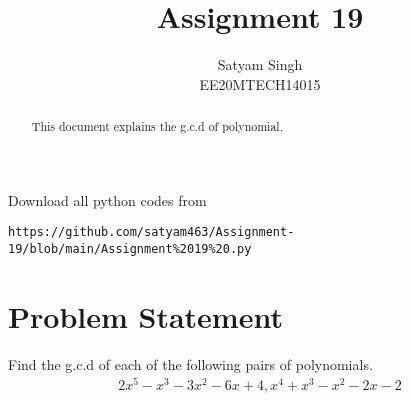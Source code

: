 \documentclass[journal,12pt,twocolumn]{IEEEtran}
\begin{document}
     \def\rightbox#1{\makebox[0in][r]{#1}}
     \def\centbox#1{\makebox[0in]{#1}}
     \def\topbox#1{\raisebox{-\baselineskip}[0in][0in]{#1}}
     \def\midbox#1{\raisebox{-0.5\baselineskip}[0in][0in]{#1}}
\vspace{3cm}
\title{Assignment 19}
\author{Satyam Singh \\ EE20MTECH14015}
\maketitle
\newpage
\bigskip
\renewcommand{\thefigure}{\theenumi}
\renewcommand{\thetable}{\theenumi}
\begin{abstract}
This document explains the g.c.d of polynomial.
\end{abstract}
Download all python codes from 
\begin{lstlisting}
https://github.com/satyam463/Assignment-19/blob/main/Assignment%2019%20.py
\end{lstlisting}
\section{Problem Statement}
Find the g.c.d of each of the following pairs of polynomials.
    \begin{align}
    2x^{5}-x^{3}-3x^{2}-6x+4 , x^{4}+x^{3}-x^{2}-2x-2
    \end{align}
\end{document}
